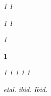 \usepackage{soul}  %

\let\booktitle\textit
\soulregister\booktitle{1}
\let\book\textit
\soulregister\book{1}

\let\journaltitle\textit
\soulregister\journaltitle{1}
\let\journal\textit
\soulregister\journal{1}

\let\newspaper\textit
\soulregister\newspaper{1}

\let\vol\textbf
\soulregister\vol{1}  %

\let\latin\textit
\soulregister\latin{1}  
\let\french\textit
\soulregister\french{1}
\let\greek\textit
\soulregister\greek{1}
\let\german\textit
\soulregister\german{1}
\let\italian\textit
\soulregister\italian{1}


\newcommand{\etal}{\textit{et\hairsp{}al.}\xspace}  %
\soulregister\etal
\newcommand{\ibid}{\textit{ibid.}\xspace}  %
\soulregister\ibid
\newcommand{\Ibid}{\textit{Ibid.}\xspace}  %
\soulregister\Ibid
